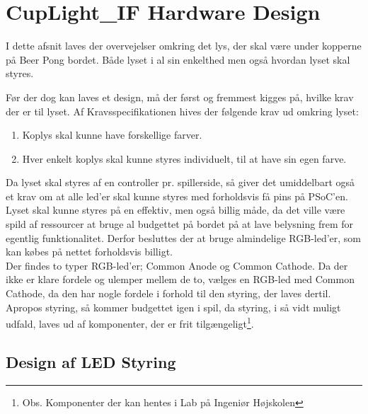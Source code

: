\documentclass[Softwaredesign/Softwaredesign\_main.tex]{subfiles}
\begin{document}
\section{CupLight\_IF Hardware Design}
 I dette afsnit laves der overvejelser omkring det lys, der skal være under kopperne på Beer Pong bordet. Både lyset i al sin enkelthed men også hvordan lyset skal styres.
 
 
Før der dog kan laves et design, må der først og fremmest kigges på, hvilke krav der er til lyset. Af Kravsspecifikationen hives der følgende krav ud omkring lyset:
\begin{enumerate}
    \item Koplys skal kunne have forskellige farver.
    \item Hver enkelt koplys skal kunne styres individuelt, til at have sin egen farve.
\end{enumerate}
Da lyset skal styres af en controller pr. spillerside, så giver det umiddelbart også et krav om at alle led'er skal kunne styres med forholdsvis få pins på PSoC'en. 
\\Lyset skal kunne styres på en effektiv, men også billig måde, da det ville være spild af ressourcer at bruge al budgettet på bordet på at lave belysning frem for egentlig funktionalitet. Derfor besluttes der at bruge almindelige RGB-led'er, som kan købes på nettet forholdsvis billigt. 
\\Der findes to typer RGB-led'er; Common Anode og Common Cathode. Da der ikke er klare fordele og ulemper mellem de to, vælges en RGB-led med Common Cathode, da den har nogle fordele i forhold til den styring, der laves dertil.
\\Apropos styring, så kommer budgettet igen i spil, da styring, i så vidt muligt udfald, laves ud af komponenter, der er frit tilgængeligt\footnote{Obs. Komponenter der kan hentes i Lab på Ingeniør Højskolen}. 

\subsection{Design af LED Styring}
\end{document}
